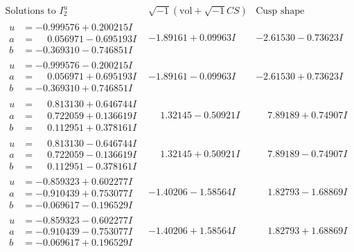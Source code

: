 \documentclass[1p]{elsarticle_modified}
\theoremstyle{definition}
\newcommand{\I}{\sqrt{-1}}
\begin{document}
$$\begin{array}{c|c|c}  
\text{Solutions to }I^u_{2}& \I (\text{vol} + \sqrt{-1}CS) & \text{Cusp shape}\\
 \hline 
\begin{aligned}
u &= -0.999576 + 0.200215 I \\
a &= \phantom{-}0.056971 - 0.695193 I \\
b &= -0.369310 - 0.746851 I\end{aligned}
 & -1.89161 + 0.09963 I & -2.61530 - 0.73623 I \\ \hline\begin{aligned}
u &= -0.999576 - 0.200215 I \\
a &= \phantom{-}0.056971 + 0.695193 I \\
b &= -0.369310 + 0.746851 I\end{aligned}
 & -1.89161 - 0.09963 I & -2.61530 + 0.73623 I \\ \hline\begin{aligned}
u &= \phantom{-}0.813130 + 0.646744 I \\
a &= \phantom{-}0.722059 + 0.136619 I \\
b &= \phantom{-}0.112951 + 0.378161 I\end{aligned}
 & \phantom{-}1.32145 - 0.50921 I & \phantom{-}7.89189 + 0.74907 I \\ \hline\begin{aligned}
u &= \phantom{-}0.813130 - 0.646744 I \\
a &= \phantom{-}0.722059 - 0.136619 I \\
b &= \phantom{-}0.112951 - 0.378161 I\end{aligned}
 & \phantom{-}1.32145 + 0.50921 I & \phantom{-}7.89189 - 0.74907 I \\ \hline\begin{aligned}
u &= -0.859323 + 0.602277 I \\
a &= -0.910439 + 0.753077 I \\
b &= -0.069617 - 0.196529 I\end{aligned}
 & -1.40206 - 1.58564 I & \phantom{-}1.82793 - 1.68869 I \\ \hline\begin{aligned}
u &= -0.859323 - 0.602277 I \\
a &= -0.910439 - 0.753077 I \\
b &= -0.069617 + 0.196529 I\end{aligned}
 & -1.40206 + 1.58564 I & \phantom{-}1.82793 + 1.68869 I \\ \hline\begin{aligned}

\end{aligned}
\end{array}$$
\end{document}
